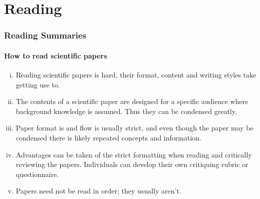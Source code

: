 \section{Reading}

\begin{frame}
    \frametitle{Reading Summaries}
    \framesubtitle{How to read scientific papers}
    \begin{enumerate}[i)]
    	\item Reading scientific papers is hard, their format, content and writing styles take getting use to.
    	\item The contents of a scientific paper are designed for a specific audience where background knowledge is assumed. Thus they can be condensed greatly.
    	\item Paper format is and flow is usually strict, and even though the paper may be condensed there is likely repeated concepts and information. 
    	\item Advantages can be taken of the strict formatting when reading and critically reviewing the papers. Individuals can develop their own critiquing rubric or questionnaire. 
    	\item Papers need not be read in order; they usually aren't.
    \end{enumerate} 
        
\end{frame}

